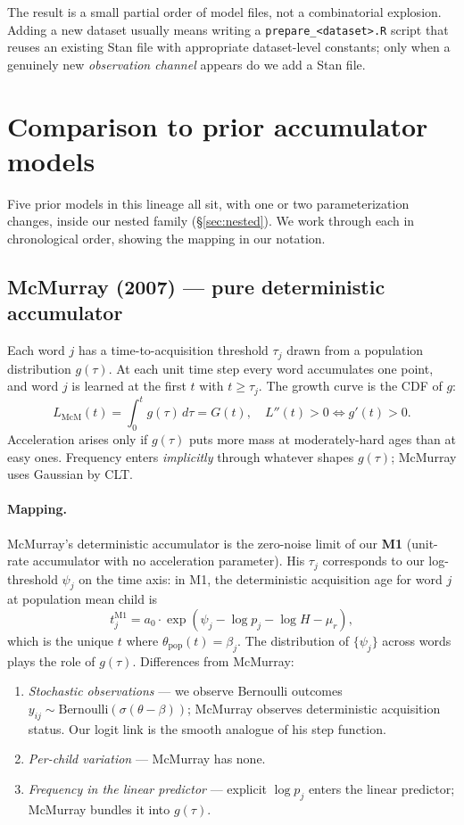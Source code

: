 \documentclass[11pt]{article}
\newcommand{\Bern}{\mathrm{Bernoulli}}
\begin{document}
The result is a small partial order of model files, not a
combinatorial explosion. Adding a new dataset usually means writing
a \texttt{prepare\_<dataset>.R} script that reuses an existing Stan
file with appropriate dataset-level constants; only when a genuinely
new \emph{observation channel} appears do we add a Stan file.

\section{Comparison to prior accumulator models}
\label{sec:compare}

Five prior models in this lineage all sit, with one or two
parameterization changes, inside our nested family
(§\ref{sec:nested}). We work through each in chronological order,
showing the mapping in our notation.

\subsection*{McMurray (2007) — pure deterministic accumulator}

Each word \(j\) has a time-to-acquisition threshold \(\tau_j\) drawn
from a population distribution \(g(\tau)\). At each unit time step
every word accumulates one point, and word \(j\) is learned at the
first \(t\) with \(t \ge \tau_j\). The growth curve is the CDF of
\(g\):
\[
L_{\mathrm{McM}}(t) = \int_0^t g(\tau)\,d\tau = G(t),
\quad
L''(t) > 0 \iff g'(t) > 0.
\]
Acceleration arises only if \(g(\tau)\) puts more mass at
moderately-hard ages than at easy ones. Frequency enters
\emph{implicitly} through whatever shapes \(g(\tau)\); McMurray uses
Gaussian by CLT.

\paragraph{Mapping.} McMurray's deterministic accumulator is the
zero-noise limit of our \textbf{M1} (unit-rate accumulator with no
acceleration parameter). His \(\tau_j\) corresponds to our
log-threshold \(\psi_j\) on the time axis: in M1, the deterministic
acquisition age for word \(j\) at population mean child is
\[
t_j^{\mathrm{M1}} = a_0 \cdot \exp(\psi_j - \log p_j - \log H - \mu_r),
\]
which is the unique \(t\) where \(\theta_{\mathrm{pop}}(t) = \beta_j\).
The distribution of \(\{\psi_j\}\) across words plays the role of
\(g(\tau)\). Differences from McMurray:
\begin{enumerate}[leftmargin=1.3em]
\item \emph{Stochastic observations} — we observe Bernoulli outcomes
\(y_{ij} \sim \Bern(\sigma(\theta - \beta))\); McMurray observes
deterministic acquisition status. Our logit link is the smooth
analogue of his step function.
\item \emph{Per-child variation} — McMurray has none.
\item \emph{Frequency in the linear predictor} — explicit \(\log p_j\)
enters the linear predictor; McMurray bundles it into \(g(\tau)\).
\end{enumerate}
\end{document}
